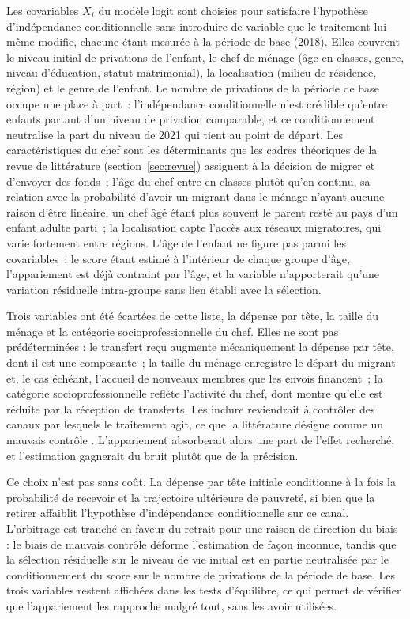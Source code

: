 Les covariables $X_i$ du modèle logit sont choisies pour satisfaire
l'hypothèse d'indépendance conditionnelle sans introduire de variable que le
traitement lui-même modifie, chacune étant mesurée à la période de base
(2018). Elles couvrent le niveau initial de privations de l'enfant, le chef
de ménage (âge en classes, genre, niveau d'éducation, statut matrimonial),
la localisation (milieu de résidence, région) et le genre de l'enfant. Le
nombre de privations de la période de base occupe une place à part~:
l'indépendance conditionnelle n'est crédible qu'entre enfants partant d'un
niveau de privation comparable, et ce conditionnement neutralise la part du
niveau de 2021 qui tient au point de départ. Les caractéristiques du chef sont les
déterminants que les cadres théoriques de la revue de littérature
(section~\ref{sec:revue}) assignent à la décision de migrer et d'envoyer des
fonds~; l'âge du chef entre en classes plutôt qu'en continu, sa relation avec
la probabilité d'avoir un migrant dans le ménage n'ayant aucune raison d'être
linéaire, un chef âgé étant plus souvent le parent resté au pays d'un enfant
adulte parti~; la localisation capte l'accès aux réseaux migratoires, qui
varie fortement entre régions. L'âge de l'enfant ne figure pas parmi les
covariables~: le score étant estimé à l'intérieur de chaque groupe d'âge,
l'appariement est déjà contraint par l'âge, et la variable n'apporterait
qu'une variation résiduelle intra-groupe sans lien établi avec la
sélection.

Trois variables ont été écartées de cette liste, la dépense par tête, la
taille du ménage et la catégorie socioprofessionnelle du chef. Elles ne sont
pas prédéterminées : le transfert reçu augmente mécaniquement la dépense par
tête, dont il est une composante~; la taille du ménage enregistre le départ du
migrant et, le cas échéant, l'accueil de nouveaux membres que les envois
financent~; la catégorie socioprofessionnelle reflète l'activité du chef, dont
\textcite{ndiaye2016} montre qu'elle est réduite par la réception de
transferts. Les inclure reviendrait à contrôler des canaux par lesquels le
traitement agit, ce que la littérature désigne comme un mauvais contrôle
\parencite{angrist2009}. L'appariement absorberait alors une part de l'effet
recherché, et l'estimation gagnerait du bruit plutôt que de la précision.

Ce choix n'est pas sans coût. La dépense par tête initiale conditionne à la
fois la probabilité de recevoir et la trajectoire ultérieure de pauvreté, si
bien que la retirer affaiblit l'hypothèse d'indépendance conditionnelle sur ce
canal. L'arbitrage est tranché en faveur du retrait pour une raison de
direction du biais : le biais de mauvais contrôle déforme l'estimation de
façon inconnue, tandis que la sélection résiduelle sur le niveau de vie
initial est en partie neutralisée par le conditionnement du score sur le
nombre de privations de la période de base. Les trois variables restent affichées dans les tests
d'équilibre, ce qui permet de vérifier que l'appariement les rapproche malgré
tout, sans les avoir utilisées.

